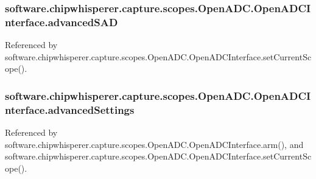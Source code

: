 \subsubsection[{advanced\+S\+A\+D}]{\setlength{\rightskip}{0pt plus 5cm}software.\+chipwhisperer.\+capture.\+scopes.\+Open\+A\+D\+C.\+Open\+A\+D\+C\+Interface.\+advanced\+S\+A\+D}\label{classsoftware_1_1chipwhisperer_1_1capture_1_1scopes_1_1OpenADC_1_1OpenADCInterface_a3303780ca16bc3fa9ed97a2f515e8580}


Referenced by software.\+chipwhisperer.\+capture.\+scopes.\+Open\+A\+D\+C.\+Open\+A\+D\+C\+Interface.\+set\+Current\+Scope().

\hypertarget{classsoftware_1_1chipwhisperer_1_1capture_1_1scopes_1_1OpenADC_1_1OpenADCInterface_ac615109a1bc18c242652b5bc1e0250d9}{}
\subsubsection[{advanced\+Settings}]{\setlength{\rightskip}{0pt plus 5cm}software.\+chipwhisperer.\+capture.\+scopes.\+Open\+A\+D\+C.\+Open\+A\+D\+C\+Interface.\+advanced\+Settings}\label{classsoftware_1_1chipwhisperer_1_1capture_1_1scopes_1_1OpenADC_1_1OpenADCInterface_ac615109a1bc18c242652b5bc1e0250d9}


Referenced by software.\+chipwhisperer.\+capture.\+scopes.\+Open\+A\+D\+C.\+Open\+A\+D\+C\+Interface.\+arm(), and software.\+chipwhisperer.\+capture.\+scopes.\+Open\+A\+D\+C.\+Open\+A\+D\+C\+Interface.\+set\+Current\+Scope().

\hypertarget{classsoftware_1_1chipwhisperer_1_1capture_1_1scopes_1_1OpenADC_1_1OpenADCInterface_ad81c68c704914ad92547e2d2106e79d2}{}
